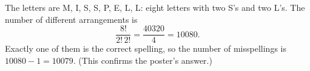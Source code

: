 The letters are M, I, S, S, P, E, L, L: eight letters with two S's and two L's. The number of different arrangements is
\[
\dfrac{8!}{2!\,2!}=\dfrac{40320}{4}=10080 .
\]
Exactly one of them is the correct spelling, so the number of misspellings is $10080-1=\boxed{10079}$. (This confirms the poster's answer.)
